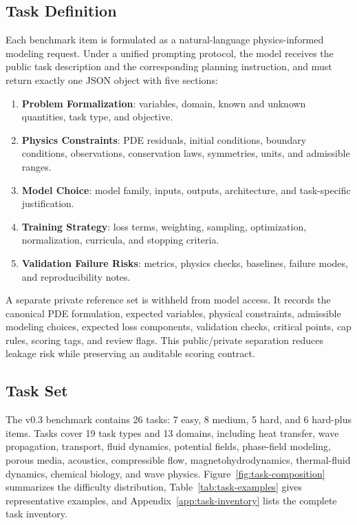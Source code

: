 \documentclass[11pt]{article}
\begin{document}
\subsection{Task Definition}

Each benchmark item is formulated as a natural-language physics-informed modeling request. Under a unified prompting protocol, the model receives the public task description and the corresponding planning instruction, and must return exactly one JSON object with five sections:
\begin{enumerate}
    \item \textbf{Problem Formalization}: variables, domain, known and unknown quantities, task type, and objective.
    \item \textbf{Physics Constraints}: PDE residuals, initial conditions, boundary conditions, observations, conservation laws, symmetries, units, and admissible ranges.
    \item \textbf{Model Choice}: model family, inputs, outputs, architecture, and task-specific justification.
    \item \textbf{Training Strategy}: loss terms, weighting, sampling, optimization, normalization, curricula, and stopping criteria.
    \item \textbf{Validation Failure Risks}: metrics, physics checks, baselines, failure modes, and reproducibility notes.
\end{enumerate}

A separate private reference set is withheld from model access. It records the canonical PDE formulation, expected variables, physical constraints, admissible modeling choices, expected loss components, validation checks, critical points, cap rules, scoring tags, and review flags. This public/private separation reduces leakage risk while preserving an auditable scoring contract.

\subsection{Task Set}

The v0.3 benchmark contains 26 tasks: 7 easy, 8 medium, 5 hard, and 6 hard-plus items. Tasks cover 19 task types and 13 domains, including heat transfer, wave propagation, transport, fluid dynamics, potential fields, phase-field modeling, porous media, acoustics, compressible flow, magnetohydrodynamics, thermal-fluid dynamics, chemical biology, and wave physics. Figure~\ref{fig:task-composition} summarizes the difficulty distribution, Table~\ref{tab:task-examples} gives representative examples, and Appendix~\ref{app:task-inventory} lists the complete task inventory.
\end{document}
